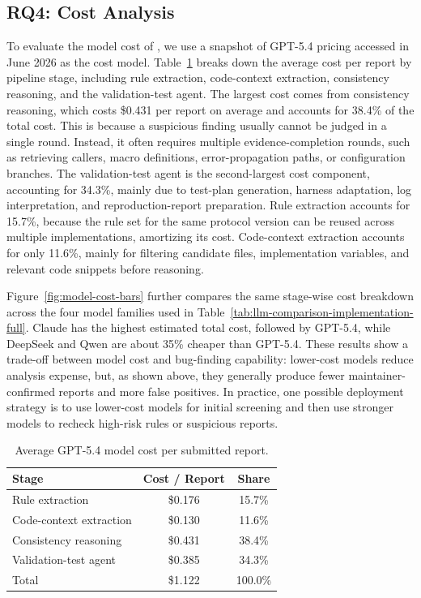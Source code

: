 \subsection{RQ4: Cost Analysis}

To evaluate the model cost of \tool{}, we use a snapshot of GPT-5.4 pricing
accessed in June 2026 as the cost model. Table~\ref{tab:cost} breaks down the
average cost per report by pipeline stage, including rule extraction,
code-context extraction, consistency
reasoning, and the validation-test agent. The largest cost comes from consistency reasoning, which costs \$0.431 per
report on average and accounts for 38.4\% of the total cost. This is because a
suspicious finding usually cannot be judged in a single round. Instead, it often
requires multiple evidence-completion rounds, such as retrieving callers, macro
definitions, error-propagation paths, or configuration branches. The
validation-test agent is the second-largest cost component, accounting for
34.3\%, mainly due to test-plan generation, harness adaptation, log
interpretation, and reproduction-report preparation. Rule extraction accounts
for 15.7\%, because the rule set for the same protocol version can be reused
across multiple implementations, amortizing its cost. Code-context extraction
accounts for only 11.6\%, mainly for filtering candidate files, implementation
variables, and relevant code snippets before reasoning.

Figure~\ref{fig:model-cost-bars} further compares the same stage-wise cost
breakdown across the four model families used in
Table~\ref{tab:llm-comparison-implementation-full}. Claude has the highest
estimated total cost, followed by GPT-5.4, while DeepSeek and Qwen are about
35\% cheaper than GPT-5.4. These results show a trade-off between model cost and
bug-finding capability: lower-cost models reduce analysis expense, but, as shown
above, they generally produce fewer maintainer-confirmed reports and more false
positives. In practice, one possible deployment strategy is to use lower-cost
models for initial screening and then use stronger models to recheck high-risk
rules or suspicious reports.

\begin{table}[t]
\centering
\caption{Average GPT-5.4 model cost per submitted report.}
\label{tab:cost}
\small
\begin{tabular}{lcc}
\toprule
\textbf{Stage} & \textbf{Cost / Report} & \textbf{Share} \\
\midrule
Rule extraction & \$0.176 & 15.7\% \\
Code-context extraction & \$0.130 & 11.6\% \\
Consistency reasoning & \$0.431 & 38.4\% \\
Validation-test agent & \$0.385 & 34.3\% \\
\midrule
Total & \$1.122 & 100.0\% \\
\bottomrule
\end{tabular}
\end{table}

